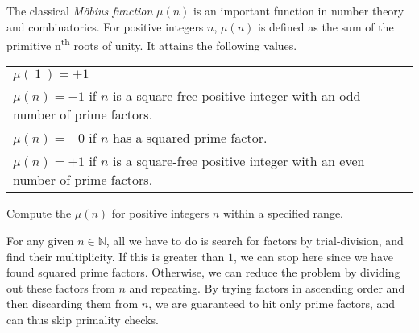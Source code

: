 

\problem The classical {\em M\"obius function} $\mu(n)$ is an important function in number theory and combinatorics. For positive integers
$n$, $\mu(n)$ is defined as the sum of the primitive n\textsuperscript{th} roots of unity. It attains the following values.
\begin{center}
\begin{tabular}{l}
	$\mu(\:\!1\:\!) =  +1$ \\
	$\mu(n) =  -1$ if $n$ is a square-free positive integer with an odd number of prime factors. \\
	$\mu(n) = \;\;\:0$ if $n$ has a squared prime factor. \\
	$\mu(n) =  +1$ if $n$ is a square-free positive integer with an even number of prime factors.
\end{tabular}
\end{center}

Compute the $\mu(n)$ for positive integers $n$ within a specified range.

\solution For any given $n \in \mathbb{N}$, all we have to do is search for factors by trial-division, and find their multiplicity.
If this is greater than $1$, we can stop here since we have found squared prime factors. Otherwise, we can reduce the problem by
dividing out these factors from $n$ and repeating. By trying factors in ascending order and then discarding them from $n$, we are
guaranteed to hit only prime factors, and can thus skip primality checks.

